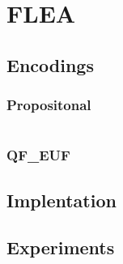 
\chapter{FLEA}



\section{Encodings}



\subsection{Propositonal}

\[ \]

\subsection{QF\_EUF}





\section{Implentation}


\section{Experiments}